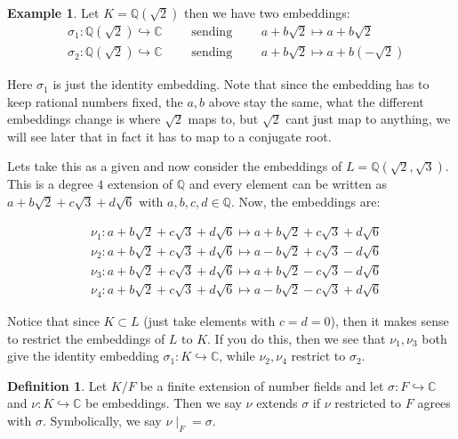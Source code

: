 \documentclass[11pt,a4paper]{report}
\theoremstyle{plain}
\theoremstyle{definition}
\newtheorem{defn}[subsection]{Definition}
\newtheorem{exmp}[subsection]{Example}
\theoremstyle{definition}
\def\CC{\mathbb{C}}
\def\QQ{\mathbb{Q}}
\def \s {\sigma}
\def \s {\sigma}
\begin{document}
	\begin{exmp}
		Let $K=\QQ(\sqrt{2})$ then we have two embeddings: 
		\begin{align}
			&\s_1: \QQ(\sqrt{2}) \hookrightarrow \CC \qquad \text{ sending } \qquad a+b\sqrt{2} \mapsto a+b\sqrt{2}\\
			&\s_2: \QQ(\sqrt{2}) \hookrightarrow \CC \qquad \text{ sending } \qquad a+b\sqrt{2} \mapsto a+b(-\sqrt{2})
		\end{align}
		
		Here $\s_1$ is just the identity embedding. Note that since the embedding has to keep rational numbers fixed, the $a,b$ above stay the same, what the different embeddings change is where $\sqrt{2}$ maps to, but $\sqrt{2}$ cant just map to anything, we will see later that in fact it has to map to a conjugate root.
		
		Lets take this as a given and now consider the embeddings of $L=\QQ(\sqrt{2},\sqrt{3})$. This is a degree $4$ extension of $\QQ$ and every element can be written as $a+b\sqrt{2}+c\sqrt{3}+d\sqrt{6}$ with $a,b,c,d \in \QQ$. Now, the embeddings are:
		
		\begin{align}
			&\nu_1: a+b\sqrt{2}+c\sqrt{3}+d\sqrt{6} \longmapsto a+b\sqrt{2}+c\sqrt{3}+d\sqrt{6}\\
			&\nu_2: a+b\sqrt{2}+c\sqrt{3}+d\sqrt{6} \longmapsto a-b\sqrt{2}+c\sqrt{3}-d\sqrt{6}\\
			&\nu_3: a+b\sqrt{2}+c\sqrt{3}+d\sqrt{6} \longmapsto a+b\sqrt{2}-c\sqrt{3}-d\sqrt{6}\\	
			&\nu_4: a+b\sqrt{2}+c\sqrt{3}+d\sqrt{6} \longmapsto a-b\sqrt{2}-c\sqrt{3}+d\sqrt{6}
		\end{align}
		
		Notice that since $K \subset L$ (just take elements with $c=d=0$), then it makes sense to restrict the embeddings of $L$ to $K$. If you do this, then we see that $\nu_1,\nu_3$ both give the identity embedding $\s_1:K \hookrightarrow \CC$, while $\nu_2,\nu_4$ restrict to $\s_2$.
		
	\end{exmp}
	
	\begin{defn}\label{defn: emb ext}
		Let $K/F$ be a finite extension of number fields and let $\s:F \hookrightarrow \CC$  and $\nu: K \hookrightarrow \CC$ be embeddings. Then we say $\nu$ extends $\s$ if $\nu$ restricted to $F$ agrees with $\s$. Symbolically, we say $\nu{\mid_F}=\s$.
	\end{defn}
	
\end{document}
